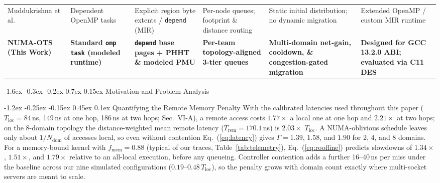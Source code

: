 \documentclass[10pt,twocolumn,letterpaper]{article}
\makeatletter
\renewcommand{\section}{\@startsection{section}{1}{\z@}%
  {-1.6ex \@plus -0.3ex \@minus -0.2ex}%
  {0.7ex \@plus 0.15ex}%
  {\normalfont\normalsize\centering\scshape}}
\renewcommand{\subsection}{\@startsection{subsection}{2}{\z@}%
  {-1.2ex \@plus -0.25ex \@minus -0.15ex}%
  {0.45ex \@plus 0.1ex}%
  {\normalfont\small\itshape}}
\makeatother
\begin{document}
\begin{table}[!t]
{\begin{tabular}{@{}l p{2.4cm} p{2.7cm} p{3.0cm} p{3.6cm} p{3.1cm}@{}}
Muddukrishna et al. \cite{ref13} & Dependent OpenMP tasks & Explicit region byte extents / \texttt{depend} (MIR) & Per-node queues; footprint \& distance routing & Static initial distribution; no dynamic migration & Extended OpenMP / custom MIR runtime \\
\textbf{NUMA-OTS (This Work)} & \textbf{Standard \texttt{omp task} (modeled runtime)} & \textbf{\texttt{depend} base pages + PHHT \& modeled PMU} & \textbf{Per-team topology-aligned 3-tier queues} & \textbf{Multi-domain net-gain, cooldown, \& congestion-gated migration} & \textbf{Designed for GCC 13.2.0 ABI; evaluated via C11 DES} \\
\bottomrule
\end{tabular}%
}
\end{table}

\section{Motivation and Problem Analysis}

\subsection{Quantifying the Remote Memory Penalty}
With the calibrated latencies used throughout this paper ($T_{\mathrm{loc}}=84$\,ns, 149\,ns at one hop, 186\,ns at two hops; Sec.~VI-A), a remote access costs $1.77\times$ a local one at one hop and $2.21\times$ at two hops; on the 8-domain topology the distance-weighted mean remote latency ($\overline{T}_{\mathrm{rem}}=170.1$\,ns) is $2.03\times$ $T_{\mathrm{loc}}$. A NUMA-oblivious schedule leaves only about $1/N_{\mathrm{dom}}$ of accesses local, so even without contention Eq.~(\ref{eq:latency}) gives $\Gamma = 1.39$, $1.58$, and $1.90$ for 2, 4, and 8 domains. For a memory-bound kernel with $f_{\mathrm{mem}} = 0.88$ (typical of our traces, Table~\ref{tab:telemetry}), Eq.~(\ref{eq:roofline}) predicts slowdowns of $1.34\times$, $1.51\times$, and $1.79\times$ relative to an all-local execution, before any queueing. Controller contention adds a further 16--40\,ns per miss under the baseline across our nine simulated configurations ($0.19$--$0.48\,T_{\mathrm{loc}}$), so the penalty grows with domain count exactly where multi-socket servers are meant to scale.
\end{document}
